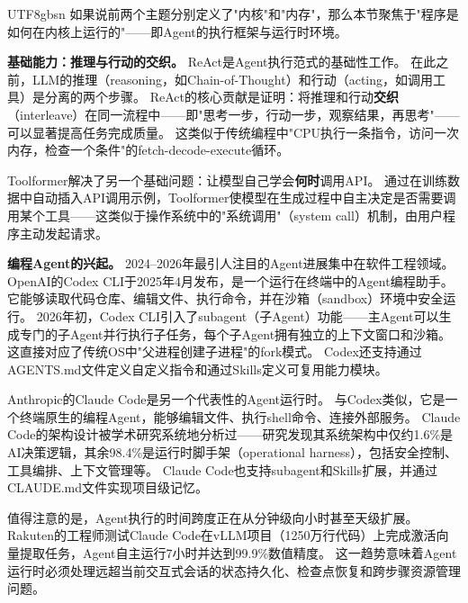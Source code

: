 \documentclass[11pt,a4paper]{article}
\begin{document}
\begin{CJK*}{UTF8}{gbsn}
如果说前两个主题分别定义了"内核"和"内存"，那么本节聚焦于"程序是如何在内核上运行的"——即Agent的执行框架与运行时环境。

\textbf{基础能力：推理与行动的交织。}
ReAct\cite{yao2023react}是Agent执行范式的基础性工作。
在此之前，LLM的推理（reasoning，如Chain-of-Thought）和行动（acting，如调用工具）是分离的两个步骤。
ReAct的核心贡献是证明：将推理和行动\textbf{交织}（interleave）在同一流程中——即"思考一步，行动一步，观察结果，再思考"——可以显著提高任务完成质量。
这类似于传统编程中"CPU执行一条指令，访问一次内存，检查一个条件"的fetch-decode-execute循环。

Toolformer\cite{schick2023toolformer}解决了另一个基础问题：让模型自己学会\textbf{何时}调用API。
通过在训练数据中自动插入API调用示例，Toolformer使模型在生成过程中自主决定是否需要调用某个工具——这类似于操作系统中的"系统调用"（system call）机制，由用户程序主动发起请求。

\textbf{编程Agent的兴起。}
2024--2026年最引人注目的Agent进展集中在软件工程领域。
OpenAI的Codex CLI\cite{openai_codex_overview_2026}于2025年4月发布，是一个运行在终端中的Agent编程助手。
它能够读取代码仓库、编辑文件、执行命令，并在沙箱（sandbox）环境中安全运行\cite{openai_codex_sandbox_2026}。
2026年初，Codex CLI引入了subagent（子Agent）功能\cite{openai_codex_subagents_2026}——主Agent可以生成专门的子Agent并行执行子任务，每个子Agent拥有独立的上下文窗口和沙箱。
这直接对应了传统OS中"父进程创建子进程"的fork模式。
Codex还支持通过AGENTS.md文件定义自定义指令\cite{openai_codex_agents_md_2026}和通过Skills定义可复用能力模块\cite{openai_codex_skills_2026}。

Anthropic的Claude Code\cite{anthropic_claudecode_overview_2026}是另一个代表性的Agent运行时。
与Codex类似，它是一个终端原生的编程Agent，能够编辑文件、执行shell命令、连接外部服务。
Claude Code的架构设计被学术研究系统地分析过\cite{dive_claudecode_2026}——研究发现其系统架构中仅约1.6\%是AI决策逻辑，其余98.4\%是运行时脚手架（operational harness），包括安全控制、工具编排、上下文管理等。
Claude Code也支持subagent\cite{anthropic_claudecode_subagents_2026}和Skills\cite{anthropic_claudecode_skills_2026}扩展，并通过CLAUDE.md文件实现项目级记忆\cite{anthropic_claudecode_memory_2026}。

值得注意的是，Agent执行的时间跨度正在从分钟级向小时甚至天级扩展。
Rakuten的工程师测试Claude Code在vLLM项目（1250万行代码）上完成激活向量提取任务，Agent自主运行7小时并达到99.9\%数值精度\cite{anthropic2026agenticreport}。
这一趋势意味着Agent运行时必须处理远超当前交互式会话的状态持久化、检查点恢复和跨步骤资源管理问题。


\end{CJK*}
\end{document}
